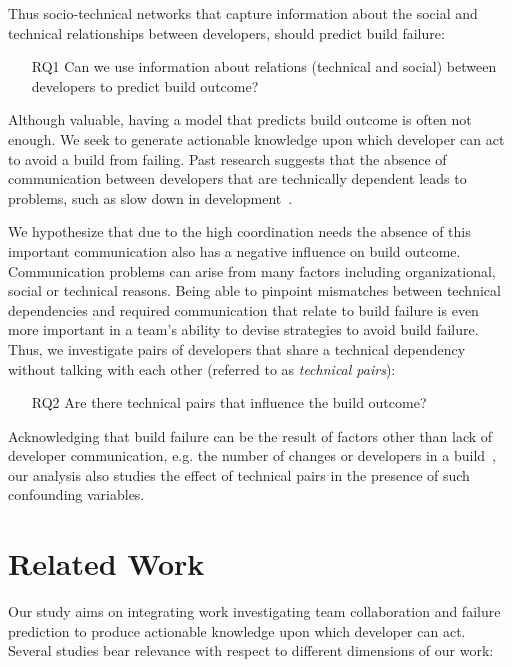 Thus
socio-technical networks that capture information about the social and technical
relationships between developers, should predict build failure:

\begin{itemize}
\item[RQ1] Can we use information about relations (technical and social) between
developers to predict build outcome?
\end{itemize}

Although valuable, having a model that predicts build outcome is often not
enough. We seek to generate actionable knowledge upon which developer can act to
avoid a build from failing. Past research suggests that the absence of
communication between developers that are technically dependent leads to
problems, such as slow down in development~\cite{cataldo:esem:2008}.


We hypothesize that due to the high coordination needs the absence of this
important communication also has a negative influence on build outcome. Communication problems can arise from many factors including organizational,
social or technical reasons. Being able to pinpoint
mismatches between technical dependencies and required communication that
relate to build failure is even more important in a team's
ability to devise strategies to avoid build failure. Thus, we
investigate pairs of developers that share a technical dependency without talking
with each other (referred to as \emph{technical pairs}):


\begin{itemize}
\item[RQ2] Are there technical pairs that influence the build outcome?
\end{itemize}

Acknowledging that build failure can be the result
of factors other than lack of developer
communication, e.g. the number of changes or developers in a build~\cite{hassan:ase:2006}, our
analysis also studies the effect of technical pairs in the presence of such
confounding variables. 







\section{Related Work}
\label{sec:relwork}
Our study aims on integrating work investigating team collaboration and failure prediction to produce actionable knowledge upon which developer can act.
Several studies bear relevance with respect to different dimensions of our work:

